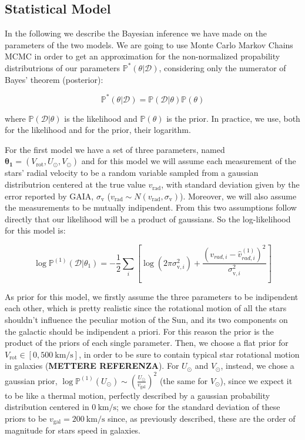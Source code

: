\subsection{Statistical Model}
In the following we describe the Bayesian inference we have made on the parameters of the two models. We are going to use Monte Carlo Markov Chains MCMC in order to get an approximation for the non-normalized propability distributrions of our parameters $\mathbb{P}^{*}(\theta \vert \mathcal{D})$, considering only the numerator of Bayes' theorem (posterior):

\begin{equation}\label{Eq:NonNormPosterior}
    \mathbb{P}^{*}(\theta \vert \mathcal{D}) = \mathbb{P}(\mathcal{D} \vert \theta) \mathbb{P}(\theta)
\end{equation}

\noindent where $\mathbb{P}(\mathcal{D} \vert \theta)$ is the likelihood and $\mathbb{P}(\theta)$ is the prior. In practice, we use, both for the likelihood and for the prior, their logarithm.

For the first model we have a set of three parameters, named $\mathbf{\theta_1} = (V_{\text{rot}}, U_{\odot}, V_{\odot})$ and for this model we will assume each measurement of the stars' radial velocity to be a random variable sampled from a gaussian distributrion centered at the true value $v_{\text{rad}}$, with standard deviation given by the error reported by GAIA, $\sigma_{\text{v}}$ ($v_{\text{rad}} \sim N(v_{\text{rad}},\sigma_{\text{v}})$). Moreover, we will also assume the measurements to be mutually indipendent. From this two assumptions follow directly that our likelihood will be a product of gaussians. So the log-likelihood for this model is:

\begin{equation}\label{Eq:LogLikeMod1}
    \log \mathbb{P}^{(1)}(\mathcal{D} \vert \theta_1) = -\frac{1}{2}\sum_i[\log(2\pi\sigma_{\text{v},i}^2)+\frac{(v_{rad,i} - \hat{v}_{rad,i}^{(1)})^2}{\sigma_{\text{v},i}^2}]
\end{equation}

As prior for this model, we firstly assume the three parameters to be indipendent each other, which is pretty realistic since the rotational motion of all the stars shouldn't influence the peculiar motion of the Sun, and its two components on the galactic should be indipendent a priori. For this reason the prior is the product of the priors of each single parameter. Then, we choose a flat prior for $V_{\text{rot}}\in[0,\qty{500}{\kilo\meter\per\second}]$, in order to be sure to contain typical star rotational motion in galaxies (\textbf{METTERE REFERENZA}). For $U_\odot$ and $V_\odot$, instead, we chose a gaussian prior, $\log\mathbb{P}^{(1)}(U_\odot) \sim (\frac{U_\odot}{v_{\text{gal}}})^2$ (the same for $V_\odot$), since we expect it to be like a thermal motion, perfectly described by a gaussian probability distribution centered in $\qty{0}{\kilo\meter\per\second}$; we chose for the standard deviation of these priors to be $v_{\text{gal}}=\qty{200}{\kilo\meter\per\second}$ since, as previously described, these are the order of magnitude for stars speed in galaxies.

